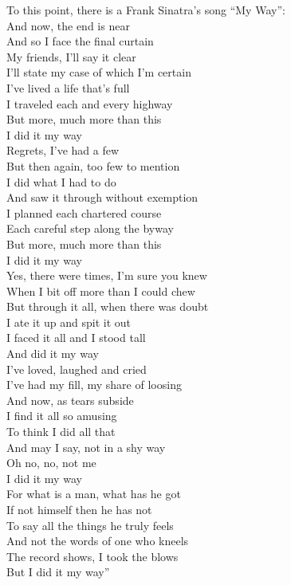 \documentclass[10pt, letterpaper]{article}
\begin{document}
\begin{spacing}{1.8}
\noindent To this point, {there is a Frank Sinatra's song ``My Way'':\\
And now, the end is near\\
And so I face the final curtain\\
My friends, I'll say it clear\\
I'll state my case of which I'm certain\\
I've lived a life that's full\\
I traveled each and every highway\\
But more, much more than this\\
I did it my way\\
Regrets, I've had a few\\
But then again, too few to mention\\
I did what I had to do\\
And saw it through without exemption\\
I planned each chartered course\\
Each careful step along the byway\\
But more, much more than this\\
I did it my way\\
Yes, there were times, I'm sure you knew\\
When I bit off more than I could chew\\
But through it all, when there was doubt\\
I ate it up and spit it out\\
I faced it all and I stood tall\\
And did it my way\\
I've loved, laughed and cried\\
I've had my fill, my share of loosing\\
And now, as tears subside\\
I find it all so amusing\\
To think I did all that\\
And may I say, not in a shy way\\
Oh no, no, not me\\
I did it my way\\
For what is a man, what has he got\\
If not himself then he has not\\
To say all the things he truly feels\\
And not the words of one who kneels\\
The record shows, I took the blows\\
But I did it my way''}\\



\end{spacing}
\end{document}
